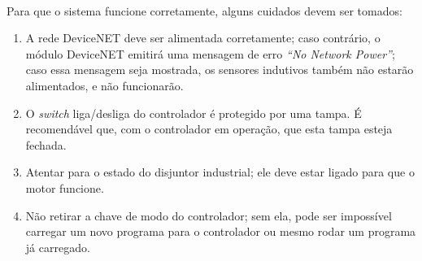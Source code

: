 \documentclass[a4paper,11pt]{scrartcl} %
\numberwithin{equation}{section} %
\numberwithin{figure}{section} %
\numberwithin{table}{section} %
\begin{document}
\paragraph{} Para que o sistema funcione corretamente, alguns cuidados devem ser tomados:
\begin{enumerate}
  \item A rede DeviceNET deve ser alimentada corretamente; caso contrário, o módulo DeviceNET emitirá uma mensagem de erro \textit{``No Network Power''}; caso essa mensagem seja mostrada, os sensores indutivos também não estarão alimentados, e não funcionarão.
  \item O \textit{switch} liga/desliga do controlador é protegido por uma tampa. É recomendável que, com o controlador em operação, que esta tampa esteja fechada.
  \item Atentar para o estado do disjuntor industrial; ele deve estar ligado para que o motor funcione.
  \item Não retirar a chave de modo do controlador; sem ela, pode ser impossível carregar um novo programa para o controlador ou mesmo rodar um programa já carregado.
\end{enumerate}
\end{document}
